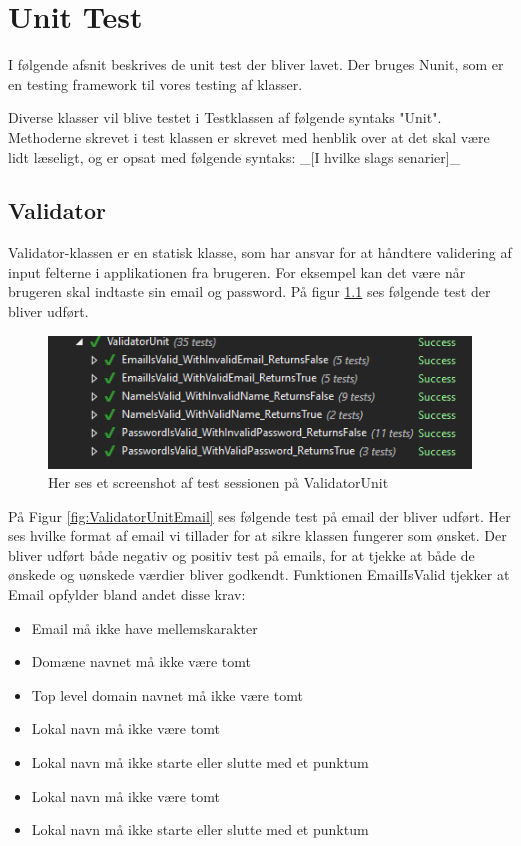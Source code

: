 \chapter{Unit Test}
I følgende afsnit beskrives de unit test der bliver lavet. Der bruges Nunit\cite{NUnit}, som er en testing framework til vores testing af klasser. 

Diverse klasser vil blive testet i Testklassen af følgende syntaks "Unit". Methoderne skrevet i test klassen er skrevet med henblik over at det skal være lidt læseligt, og er opsat med følgende syntaks: 
\_[I hvilke slags senarier]\_ 

\section{Validator}
Validator-klassen er en statisk klasse, som har ansvar for at håndtere validering af input felterne i applikationen fra brugeren. For eksempel kan det være når brugeren skal indtaste sin email og password. På figur \ref{fig:ValidatorUnit} ses følgende test der bliver udført.
\begin{figure}[H]
	\centering
	\includegraphics[width=0.6\linewidth]{Unit/ValidatorUnit.PNG}
	\caption{Her ses et screenshot af test sessionen på ValidatorUnit}
	\label{fig:ValidatorUnit}
\end{figure}

På Figur \ref{fig:ValidatorUnitEmail} ses følgende test på email der bliver udført. Her ses hvilke format af email vi tillader for at sikre klassen fungerer som ønsket.
Der bliver udført både negativ og positiv test på emails, for at tjekke at både de ønskede og uønskede værdier bliver godkendt. Funktionen EmailIsValid tjekker at Email opfylder bland andet disse krav:\\
\begin{itemize}
	\item Email må ikke have mellemskarakter
	\item Domæne navnet må ikke være tomt
	\item Top level domain navnet\cite{TLD} må ikke være tomt
	\item Lokal navn må ikke være tomt
	\item Lokal navn må ikke starte eller slutte med et punktum
	\item Lokal navn må ikke være tomt
	\item Lokal navn må ikke starte eller slutte med et punktum
	
\end{itemize}

